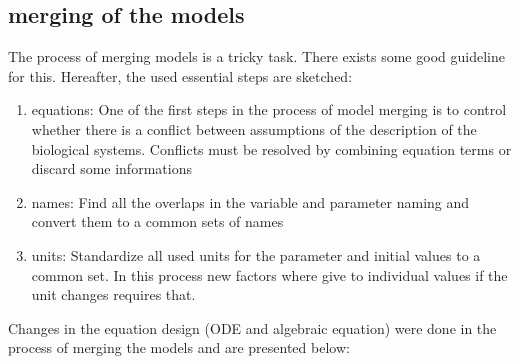 \subsection{merging of the models}
The process of merging models is a tricky task. There exists some good guideline \cite{Liebermeister2008ValidityAC} for this.
Hereafter, the used essential steps are sketched:
\begin{enumerate}
	\item equations: One of the first steps in the process of model merging is to control whether there is a conflict between assumptions of the description of the biological systems. Conflicts must be resolved by combining equation terms or discard some informations
	\item names: Find all the overlaps in the variable and parameter naming and convert them to a common sets of names
	\item units: Standardize all used units for the parameter and initial values to a common set. In this process new factors where give to individual values if the unit changes requires that.
\end{enumerate}
Changes in the equation design (ODE and algebraic equation) were done in the process of merging the models and are presented below:

